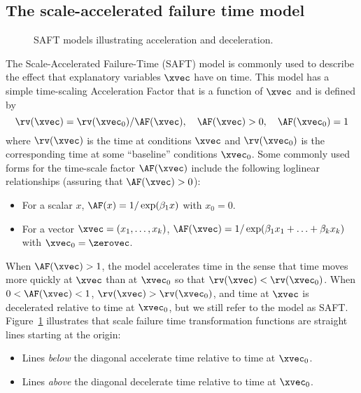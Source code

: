 \subsection{The scale-accelerated failure time model}
\label{section:saft.model}
\begin{figure}
\caption{SAFT models illustrating acceleration and deceleration.}
\label{figure:sft.transform.ps}
\end{figure}
The Scale-Accelerated Failure-Time (SAFT) model is commonly used
to describe the effect that
explanatory variables $\xvec$ have on time. This model
has a simple time-scaling
Acceleration Factor that is a function of $\xvec$ and is defined by
\begin{equation}
\label{equation:regr.saft}
\rv(\xvec)=\rv(\xvec_{0})/\AF(\xvec), \quad
\AF(\xvec) > 0, \quad \AF(\xvec_{0})=1
\end{equation}
where $\rv(\xvec)$ is the time at conditions $\xvec$ and
$\rv(\xvec_{0})$ is the corresponding time at some ``baseline'' conditions
$\xvec_{0}$.
Some commonly used forms for the time-scale factor
$\AF(\xvec)$ include the following loglinear
relationships (assuring that $\AF(\xvec)>0$):
\begin{itemize}
\item 
For a scalar $x$, $\AF(x)=1/\exp(\beta_{1}x)$ with $x_{0} =  0$.
\item
For a vector $\xvec=( x_{1}, \dots, x_{k} )$,
$\AF(\xvec)=1/\exp(\beta_{1}x_{1}+ \ldots +\beta_{k}x_{k})$ with
$\xvec_{0}  = \zerovec$. 
\end{itemize} 
When $\AF(\xvec) > 1$, the model accelerates time in the sense that
time moves more quickly at $\xvec$ than at $\xvec_{0}$ so that $\rv(\xvec)
< \rv(\xvec_{0})$.  When $0< \AF(\xvec) < 1$, $\rv(\xvec) >
\rv(\xvec_{0})$, and time at $\xvec$ is decelerated relative to time
at $\xvec_{0}$, but we still refer to the model as SAFT.  
Figure~\ref{figure:sft.transform.ps} illustrates that scale failure
time 
transformation functions
are straight lines starting at the origin:
\begin{itemize}
\item
Lines {\em below} the diagonal accelerate time relative to
time at $\xvec_{0}$.
\item
Lines {\em above} the diagonal decelerate time relative to
time at $\xvec_{0}$.
\end{itemize}

